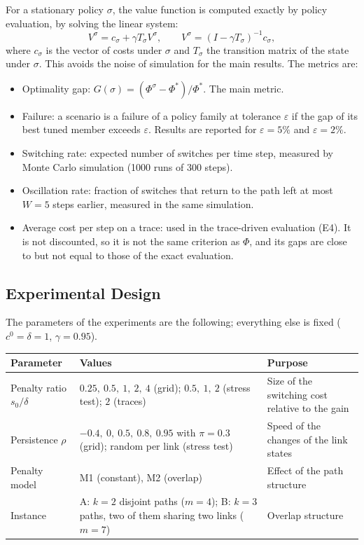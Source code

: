 \documentclass{amsart}
\begin{document}
For a stationary policy $\sigma$, the value function is computed exactly by policy evaluation, by solving the linear system:
\begin{equation}
  V^{\sigma} = c_{\sigma} + \gamma T_{\sigma} V^{\sigma}, \qquad
  V^{\sigma} = (I - \gamma T_{\sigma})^{-1} c_{\sigma},
  \label{eq:policyeval}
\end{equation}
where $c_\sigma$ is the vector of costs under $\sigma$ and $T_\sigma$ the transition matrix of the state under $\sigma$. This avoids the noise of simulation for the main results. The metrics are:
\begin{itemize}
  \item Optimality gap: $G(\sigma) = (\Phi^{\sigma} - \Phi^*)/\Phi^*$. The main metric.
  \item Failure: a scenario is a failure of a policy family at tolerance $\varepsilon$ if the gap of its best tuned member exceeds $\varepsilon$. Results are reported for $\varepsilon = 5\%$ and $\varepsilon = 2\%$.
  \item Switching rate: expected number of switches per time step, measured by Monte Carlo simulation (1000 runs of 300 steps).
  \item Oscillation rate: fraction of switches that return to the path left at most $W = 5$ steps earlier, measured in the same simulation.
  \item Average cost per step on a trace: used in the trace-driven evaluation (E4). It is not discounted, so it is not the same criterion as $\Phi$, and its gaps are close to but not equal to those of the exact evaluation.
\end{itemize}

\subsection{Experimental Design}

The parameters of the experiments are the following; everything else is fixed ($c^0 = \delta = 1$, $\gamma = 0.95$).

\begin{table}[ht]
  \centering
  \footnotesize
  \begin{tabular}{@{}>{\raggedright\arraybackslash}p{}>{\raggedright\arraybackslash}p{}>{\raggedright\arraybackslash}p{}@{}}
    \toprule
    Parameter & Values & Purpose \\
    \midrule
    Penalty ratio $s_0/\delta$ & $0.25,\ 0.5,\ 1,\ 2,\ 4$ (grid); $0.5,\ 1,\ 2$ (stress test); $2$ (traces) & Size of the switching cost relative to the gain \\
    Persistence $\rho$ & $-0.4,\ 0,\ 0.5,\ 0.8,\ 0.95$ with $\pi = 0.3$ (grid); random per link (stress test) & Speed of the changes of the link states \\
    Penalty model & M1 (constant), M2 (overlap) & Effect of the path structure \\
    Instance & A: $k = 2$ disjoint paths ($m = 4$); B: $k = 3$ paths, two of them sharing two links ($m = 7$) & Overlap structure \\
    \bottomrule
  \end{tabular}
\end{table}
\end{document}
